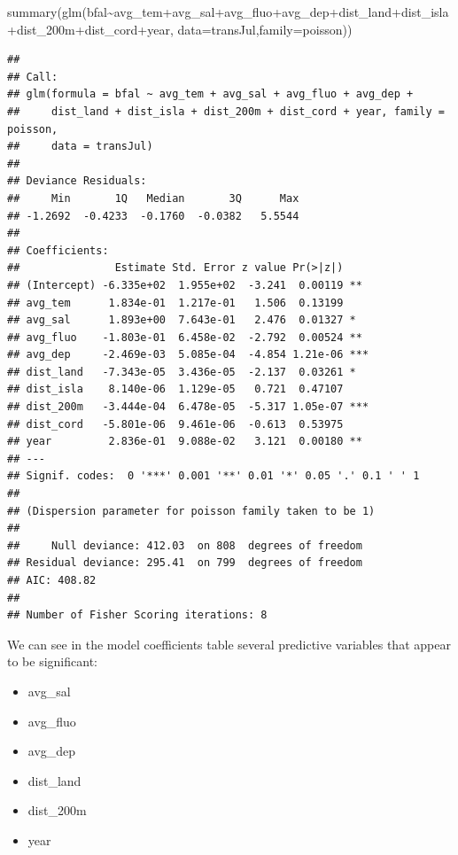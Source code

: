 \documentclass[
]{book}
\newenvironment{Shaded}{\begin{snugshade}}{\end{snugshade}}
\newcommand{\AttributeTok}[1]{\textcolor[rgb]{0.61,0.61,0.61}{#1}}
\newcommand{\FunctionTok}[1]{\textcolor[rgb]{0,0,0}{#1}}
\newcommand{\NormalTok}[1]{#1}
\newcommand{\SpecialCharTok}[1]{\textcolor[rgb]{0,0,0}{#1}}
\providecommand{\tightlist}{%
  \setlength{\itemsep}{0pt}\setlength{\parskip}{0pt}}
\begin{document}
\begin{Shaded}
\begin{Highlighting}[]
\FunctionTok{summary}\NormalTok{(}\FunctionTok{glm}\NormalTok{(bfal}\SpecialCharTok{\textasciitilde{}}\NormalTok{avg\_tem}\SpecialCharTok{+}\NormalTok{avg\_sal}\SpecialCharTok{+}\NormalTok{avg\_fluo}\SpecialCharTok{+}\NormalTok{avg\_dep}\SpecialCharTok{+}\NormalTok{dist\_land}\SpecialCharTok{+}\NormalTok{dist\_isla}\SpecialCharTok{+}\NormalTok{dist\_200m}\SpecialCharTok{+}\NormalTok{dist\_cord}\SpecialCharTok{+}\NormalTok{year, }\AttributeTok{data=}\NormalTok{transJul,}\AttributeTok{family=}\NormalTok{poisson))}
\end{Highlighting}
\end{Shaded}

\begin{verbatim}
## 
## Call:
## glm(formula = bfal ~ avg_tem + avg_sal + avg_fluo + avg_dep + 
##     dist_land + dist_isla + dist_200m + dist_cord + year, family = poisson, 
##     data = transJul)
## 
## Deviance Residuals: 
##     Min       1Q   Median       3Q      Max  
## -1.2692  -0.4233  -0.1760  -0.0382   5.5544  
## 
## Coefficients:
##               Estimate Std. Error z value Pr(>|z|)    
## (Intercept) -6.335e+02  1.955e+02  -3.241  0.00119 ** 
## avg_tem      1.834e-01  1.217e-01   1.506  0.13199    
## avg_sal      1.893e+00  7.643e-01   2.476  0.01327 *  
## avg_fluo    -1.803e-01  6.458e-02  -2.792  0.00524 ** 
## avg_dep     -2.469e-03  5.085e-04  -4.854 1.21e-06 ***
## dist_land   -7.343e-05  3.436e-05  -2.137  0.03261 *  
## dist_isla    8.140e-06  1.129e-05   0.721  0.47107    
## dist_200m   -3.444e-04  6.478e-05  -5.317 1.05e-07 ***
## dist_cord   -5.801e-06  9.461e-06  -0.613  0.53975    
## year         2.836e-01  9.088e-02   3.121  0.00180 ** 
## ---
## Signif. codes:  0 '***' 0.001 '**' 0.01 '*' 0.05 '.' 0.1 ' ' 1
## 
## (Dispersion parameter for poisson family taken to be 1)
## 
##     Null deviance: 412.03  on 808  degrees of freedom
## Residual deviance: 295.41  on 799  degrees of freedom
## AIC: 408.82
## 
## Number of Fisher Scoring iterations: 8
\end{verbatim}

We can see in the model coefficients table several predictive variables that appear to be significant:

\begin{itemize}
\tightlist
\item
  avg\_sal
\item
  avg\_fluo
\item
  avg\_dep
\item
  dist\_land
\item
  dist\_200m
\item
  year
\end{itemize}
\end{document}
